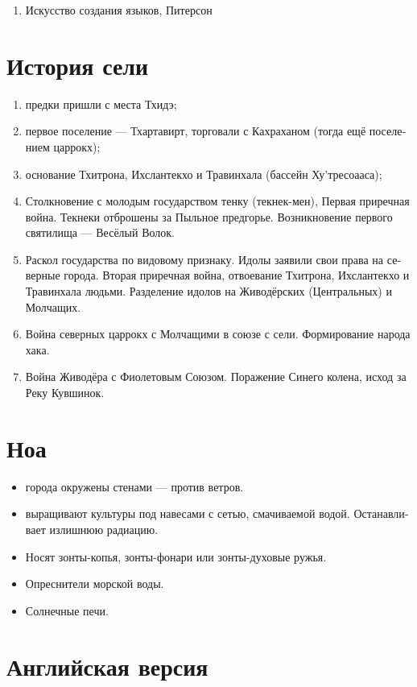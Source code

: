 \documentclass[a4paper,12pt,fleqn]{book}\usepackage{cooltooltips}\usepackage{polyglossia}\setdefaultlanguage[babelshorthands=true]{russian}\setotherlanguage{english}\defaultfontfeatures{Ligatures=TeX,Mapping=tex-text} \usepackage{xcolor}\definecolor{lightgray}{HTML}{bbbbbb}\color{lightgray}\newcommand{\ml}[3]{\textenglish{\textcolor{black}{#3}}}
\begin{document}
{\begin{enumerate}

\item Искусство создания языков, Питерсон

\end{enumerate}

\section{История сели}

\begin{enumerate}
\item предки пришли с места Тхидэ;
\item первое поселение --- Тхартавирт, торговали с Кахраханом (тогда ещё поселением царрокх);
\item основание Тхитрона, Ихслантекхо и Травинхала (бассейн Ху'тресоааса);
\item Столкновение с молодым государством тенку (текнек-мен), Первая приречная война.
Текнеки отброшены за Пыльное предгорье.
Возникновение первого святилища --- Весёлый Волок.
\item Раскол государства по видовому признаку.
Идолы заявили свои права на северные города.
Вторая приречная война, отвоевание Тхитрона, Ихслантекхо и Травинхала людьми.
Разделение идолов на Живодёрских (Центральных) и Молчащих.
\item Война северных царрокх с Молчащими в союзе с сели.
Формирование народа хака.
\item Война Живодёра с Фиолетовым Союзом.
Поражение Синего колена, исход за Реку Кувшинок.
\end{enumerate}

\section{Ноа}

\begin{itemize}
\item города окружены стенами --- против ветров.
\item выращивают культуры под навесами с сетью, смачиваемой водой.
Останавливает излишнюю радиацию.
\item Носят зонты-копья, зонты-фонари или зонты-духовые ружья.
\item Опреснители морской воды.
\item Солнечные печи.
\end{itemize}

\section{Английская версия}

}
\end{document}
